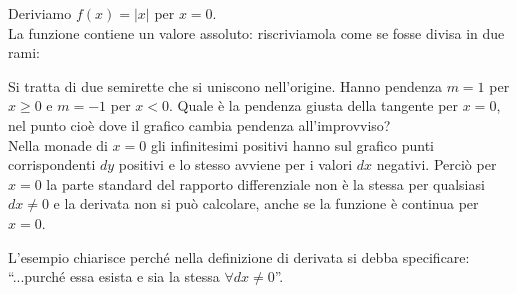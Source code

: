 \begin{esempio}
\label{esempio:diff01_derimodulo}
 Deriviamo $f(x)=|x|$ per $x=0$.\\
 La funzione contiene un valore assoluto: riscriviamola come se fosse 
 divisa in due rami:\\
 
\begin{figure}[h!]
\label{}
\end{figure} 

Si tratta di due semirette che si uniscono nell'origine. Hanno pendenza $m=1$ 
per $x$ e $m=-1$ per $x<0$. Quale è la pendenza giusta della tangente per
$x=0$, nel punto cioè dove il grafico cambia pendenza all'improvviso?\\
Nella monade di $x=0$ gli infinitesimi positivi hanno sul grafico punti 
corrispondenti $dy$ positivi e lo stesso avviene per i valori $dx$ negativi. 
Perciò per $x=0$ la parte standard del rapporto 
differenziale non è la stessa per qualsiasi $dx$ e la derivata non si può
calcolare, anche se la funzione è continua per $x=0$.
\end{esempio}

L'esempio chiarisce perché nella definizione di derivata si debba specificare: 
``...purché essa esista e sia la stessa $\forall dx$''.

